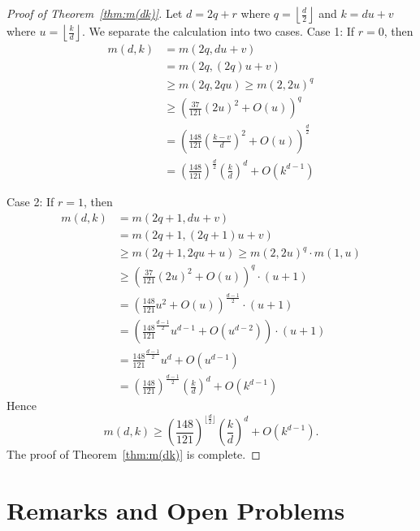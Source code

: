 \documentclass[11pt]{article}
\theoremstyle{definition}
\begin{document}
\begin{proof}[Proof of Theorem~\ref{thm:m(dk)}]
Let $d = 2q +r$ where $q =\displaystyle\left \lfloor \frac{d}{2}\right\rfloor$ and $k = du +v$ where $u =\displaystyle \left \lfloor \frac{k}{d}\right\rfloor$. We separate the calculation into two cases.
Case 1: If $r = 0$, then
\begin{align*}
m(d,k) &= m(2q, du +v)\\
&= m(2q, (2q)u +v)\\
&\geq m(2q, 2qu) \geq m(2, 2u)^q\\
&\geq \left(\frac{37}{121}(2u)^2+ O(u)\right)^q \\
&= \left(\frac{148}{121} \left(\frac{k-v}{d}\right) ^2+ O(u)\right)^{ \frac{d}{2}}\\
&= \left(\frac{148}{121}\right)^{ \frac{d}{2}}\left(\frac{k}{d}\right)^d + O(k^{d-1})
\end{align*}

Case 2: If $r = 1$, then
\begin{align*}
m(d,k) &= m(2q+1, du +v)\\
&= m(2q+1, (2q+1)u +v)\\
&\geq m(2q+1, 2qu + u) \geq m(2, 2u)^q \cdot m(1,u)\\
&\geq \left(\frac{37}{121}(2u)^2+ O(u)\right)^q \cdot (u+1) \\
&= \left(\frac{148}{121} u^2 + O(u)\right)^{ \frac{d-1}{2}} \cdot (u+1)\\
&= \left(\frac{148}{121}^{ \frac{d-1}{2}} u ^{d-1}+ O(u^{d-2})\right) \cdot (u+1)\\
&= \frac{148}{121}^{ \frac{d-1}{2}} u ^{d}+ O(u^{d-1})\\
&= \left(\frac{148}{121}\right)^{ \frac{d-1}{2}}\left(\frac{k}{d}\right)^d + O(k^{d-1})
\end{align*}
Hence 
\[
m(d,k) \geq \left(\frac{148}{121}\right)^{\lfloor \frac{d}{2}\rfloor}\left(\frac{k}{d}\right)^d + O(k^{d-1}).
\]
The proof of Theorem~\ref{thm:m(dk)} is complete.
\end{proof}



\section{Remarks and Open Problems}
\end{document}
